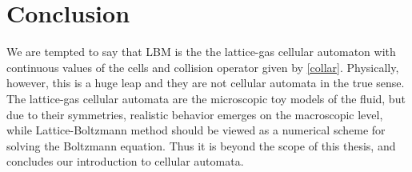 \section{Conclusion}
We are tempted to say that LBM is the the lattice-gas cellular automaton with continuous values of the cells and collision operator given by \ref{collar}.
Physically, however, this is a huge leap and they are not cellular automata in the true sense. The lattice-gas cellular automata are the microscopic toy models of the fluid, but due to their symmetries, realistic behavior emerges on the macroscopic level, while Lattice-Boltzmann method should be viewed as a numerical scheme for solving the Boltzmann equation. Thus it is beyond the scope of this thesis, and concludes our introduction to cellular automata.
